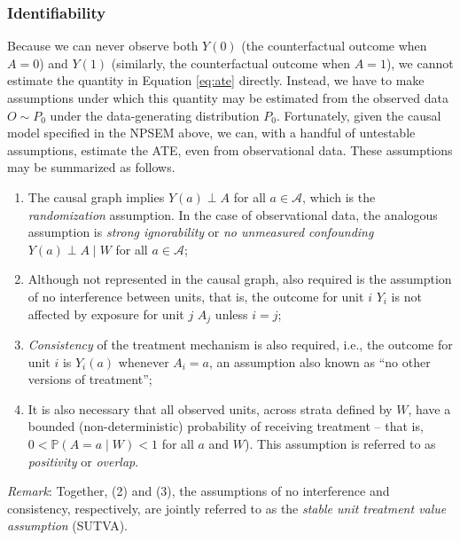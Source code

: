 \documentclass[12pt, krantz2,]{krantz}
\providecommand{\tightlist}{%
  \setlength{\itemsep}{0pt}\setlength{\parskip}{0pt}}
\theoremstyle{definition}
\theoremstyle{definition}
\theoremstyle{definition}
\renewcommand{\P}{\mathbb{P}}
\newcommand{\1}{\mathbbm{1}}
\begin{document}
\hypertarget{identifiability}{%
\subsubsection*{Identifiability}\label{identifiability}}


Because we can never observe both \(Y(0)\) (the counterfactual outcome when \(A=0\))
and \(Y(1)\) (similarly, the counterfactual outcome when \(A=1\)), we cannot
estimate the quantity in Equation \eqref{eq:ate} directly. Instead, we have to
make assumptions under which this quantity may be estimated from the observed
data \(O \sim P_0\) under the data-generating distribution \(P_0\). Fortunately,
given the causal model specified in the NPSEM above, we can, with a handful of
untestable assumptions, estimate the ATE, even from observational data. These
assumptions may be summarized as follows.

\begin{enumerate}
\def\labelenumi{\arabic{enumi}.}
\tightlist
\item
  The causal graph implies \(Y(a) \perp A\) for all \(a \in \mathcal{A}\), which
  is the \emph{randomization} assumption. In the case of observational data, the
  analogous assumption is \emph{strong ignorability} or \emph{no unmeasured confounding}
  \(Y(a) \perp A \mid W\) for all \(a \in \mathcal{A}\);
\item
  Although not represented in the causal graph, also required is the assumption
  of no interference between units, that is, the outcome for unit \(i\) \(Y_i\) is
  not affected by exposure for unit \(j\) \(A_j\) unless \(i=j\);
\item
  \emph{Consistency} of the treatment mechanism is also required, i.e., the outcome
  for unit \(i\) is \(Y_i(a)\) whenever \(A_i = a\), an assumption also known as ``no
  other versions of treatment'';
\item
  It is also necessary that all observed units, across strata defined by \(W\),
  have a bounded (non-deterministic) probability of receiving treatment --
  that is, \(0 < \P(A = a \mid W) < 1\) for all \(a\) and \(W\)). This assumption
  is referred to as \emph{positivity} or \emph{overlap}.
\end{enumerate}

\emph{Remark}: Together, (2) and (3), the assumptions of no interference and
consistency, respectively, are jointly referred to as the \emph{stable unit
treatment value assumption} (SUTVA).
\end{document}
